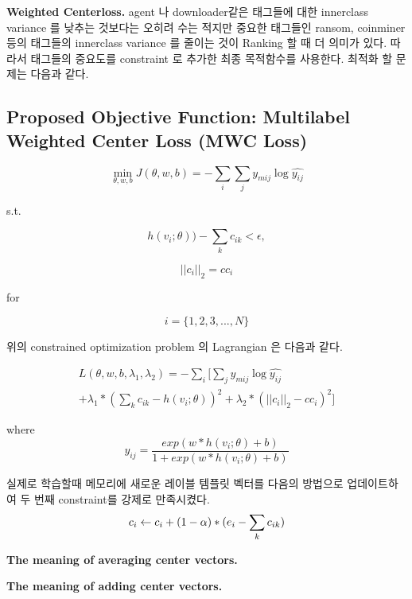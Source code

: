 \textbf{Weighted Centerloss. }
agent 나 downloader같은 태그들에 대한 innerclass variance 를 낮추는 것보다는 오히려 수는 적지만 중요한 태그들인 ransom, coinminer 등의 태그들의 innerclass variance 를 줄이는 것이 Ranking 할 때 더 의미가 있다. 따라서 태그들의 중요도를 constraint 로 추가한 최종 목적함수를 사용한다. 최적화 할 문제는 다음과 같다. 


\subsection{Proposed Objective Function: Multilabel Weighted Center Loss (MWC Loss)}


\begin{equation}
\label{eqn:06}
\min_{\theta, w, b} J(\theta, w, b) = -\sum_i{ \sum_j{ y_{mij} \log{\hat{y_{ij}}}}}
\end{equation}

s.t.

\[
h(v_i;\theta)) - \sum_k{c_{ik}} < \epsilon ,
\]


\[
||c_i||_2 = cc_i
\]

for

\[
 i = \{1,2,3, ..., N\}
\]

위의 constrained optimization problem 의 Lagrangian 은 다음과 같다.

\begin{equation}
\label{eqn:07}
\begin{split}
L(\theta, w, b, \lambda_1, \lambda_2) = -\sum_i{[ \sum_j{ y_{mij} \log{\hat{y_{ij}}}}} \\  
+ \lambda_1 * (\sum_k{c_{ik}} - h(v_i;\theta))^2 + \lambda_2 * (||c_i||_2 - cc_i)^2 ]
\end{split}
\end{equation}

where 
\[
\hat{y_{ij}} = \frac{exp(w*h(v_i;\theta)+b)}{ 1 + exp(w*h(v_i;\theta)+b)}
\]

실제로 학습할때 메모리에 새로운 레이블 템플릿 벡터를 다음의 방법으로 업데이트하여 두 번째 constraint를 강제로 만족시켰다. 
\begin{equation}
\label{eqn:08}
c_i \leftarrow c_i + (1-\alpha) * (e_i - \sum_k{c_{ik}}) \\  
\end{equation}


\textbf{The meaning of averaging center vectors. }

\textbf{The meaning of adding center vectors. }



